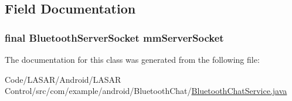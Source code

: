 \subsection{Field Documentation}
\hypertarget{classcom_1_1example_1_1android_1_1_bluetooth_chat_1_1_bluetooth_chat_service_1_1_accept_thread_a0b04e3279c0cd8ff1bc19ab19c7539d9}{
\subsubsection[{mm\-Server\-Socket}]{\setlength{\rightskip}{0pt plus 5cm}final Bluetooth\-Server\-Socket {\bf mm\-Server\-Socket}}}\label{classcom_1_1example_1_1android_1_1_bluetooth_chat_1_1_bluetooth_chat_service_1_1_accept_thread_a0b04e3279c0cd8ff1bc19ab19c7539d9}


The documentation for this class was generated from the following file\-:\begin{DoxyCompactItemize}
\item 
Code/\-L\-A\-S\-A\-R/\-Android/\-L\-A\-S\-A\-R Control/src/com/example/android/\-Bluetooth\-Chat/\hyperlink{_bluetooth_chat_service_8java}{Bluetooth\-Chat\-Service.\-java}\end{DoxyCompactItemize}
